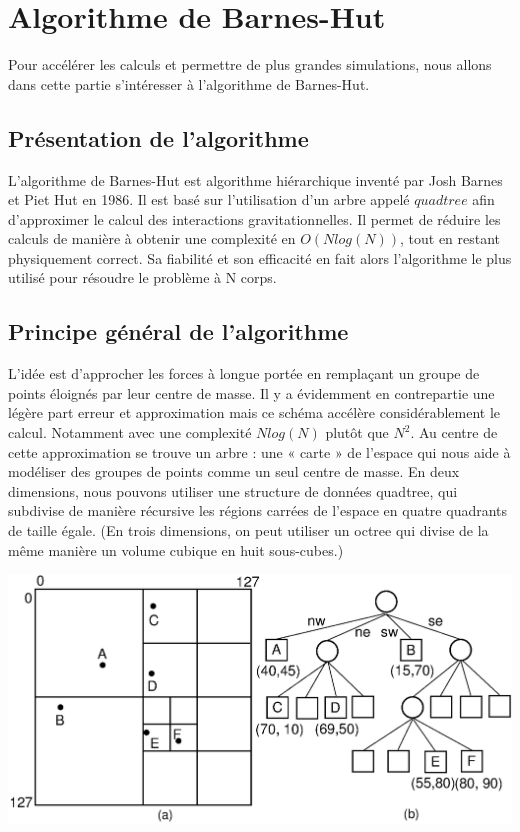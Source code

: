 \chapter{Algorithme de Barnes-Hut}

Pour accélérer les calculs et permettre de plus grandes simulations, nous allons dans cette partie s’intéresser à l’algorithme de Barnes-Hut.

\section{Présentation de l'algorithme}

L'algorithme de Barnes-Hut est algorithme hiérarchique inventé par Josh Barnes et Piet Hut en 1986. Il est basé sur l'utilisation d'un arbre appelé $quadtree$ afin d'approximer le calcul des  interactions gravitationnelles. Il permet de réduire les calculs de manière à obtenir une complexité en $O(Nlog(N))$, tout en restant physiquement correct. Sa fiabilité et son efficacité en fait alors l'algorithme le plus utilisé pour résoudre le problème à N corps.
 
\section{Principe général de l'algorithme}

L'idée est d'approcher les forces à longue portée en remplaçant un groupe de points éloignés par leur centre de masse. Il y a évidemment en contrepartie une légère part erreur et approximation mais ce schéma accélère considérablement le calcul. Notamment avec une complexité $ Nlog(N)$ plutôt que $N^2$.
Au centre de cette approximation se trouve un arbre : une « carte » de l'espace qui nous aide à modéliser des groupes de points comme un seul centre de masse. En deux dimensions, nous pouvons utiliser une structure de données quadtree, qui subdivise de manière récursive les régions carrées de l'espace en quatre quadrants de taille égale. (En trois dimensions, on peut utiliser un octree qui divise de la même manière un volume cubique en huit sous-cubes.)


\begin{center}
\includegraphics[scale=0.2]{./images/quadtree.png}
\label{figbh}
\end{center}

